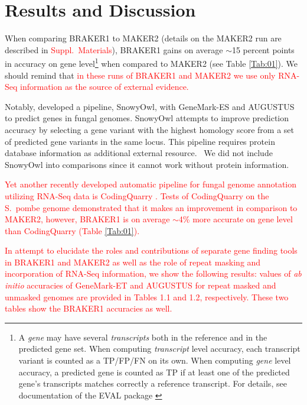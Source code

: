 \documentclass[a4paper,10pt]{article}
\begin{document}
\section{Results and Discussion}

When comparing BRAKER1 to MAKER2 (details on the MAKER2 run are described in \textcolor{red}{Suppl.~Materials}), BRAKER1 gains on average $\sim$15 percent points in accuracy on gene level\footnote{A \textit{gene} may have several \textit{transcripts} both in the reference and in the predicted gene set. When computing \textit{transcript} level accuracy, each transcript variant is counted as a TP/FP/FN on its own. When computing \textit{gene} level accuracy, a predicted gene is counted as TP if at least one of the predicted gene's transcripts matches correctly a reference transcript. For details, see documentation of the EVAL package \citep{Eval}} when compared to MAKER2 (see Table \ref{Tab:01}).
We should remind that \textcolor{red}{in these runs of BRAKER1 and MAKER2 we use only RNA-Seq information as the source of external evidence.}

Notably, \citet{SnowyOwl} developed a pipeline, SnowyOwl, with GeneMark-ES \citep{GeneMark-ES} and AUGUSTUS to predict genes in fungal genomes. SnowyOwl attempts to improve prediction accuracy by selecting a gene variant with the highest homology score from a set of predicted gene variants in the same locus. This pipeline requires protein database information as additional external resource.  We did not include SnowyOwl into comparisons since it cannot work without protein information.%

\textcolor{red}{Yet another recently developed automatic pipeline for fungal genome annotation utilizing RNA-Seq data is CodingQuarry \citep{CodingQuarry}. Tests of CodingQuarry on the S.~pombe genome demonstrated that it makes an improvement in comparison to MAKER2, however, BRAKER1 is on average $\sim$4\% more accurate on gene level than CodingQuarry (Table \ref{Tab:01}).}

\textcolor{red}{In attempt to elucidate the roles and contributions of separate gene finding tools in BRAKER1 and MAKER2 as well as the role of repeat masking and incorporation of RNA-Seq information, we show the following results:  values of \textit{ab initio} accuracies of GeneMark-ET and AUGUSTUS for repeat masked and unmasked genomes are provided in Tables 1.1 and 1.2, respectively. These two tables show the BRAKER1 accuracies as well.}
\end{document}
